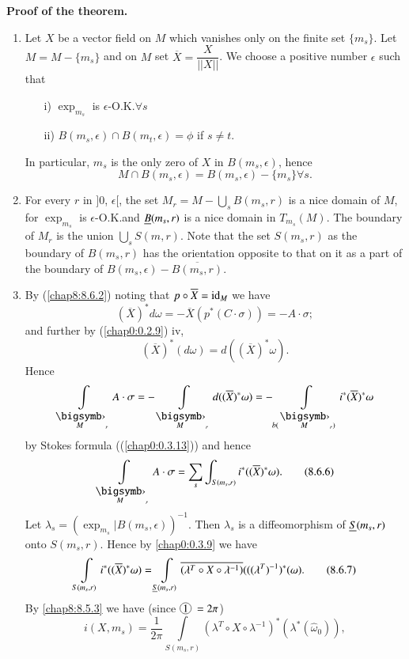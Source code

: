 \noindent
{\bf Proof of the theorem.}~\pageoriginale
\begin{enumerate}
\renewcommand{\theenumi}{\alph{enumi}}
\renewcommand{\labelenumi}{\theenumi)}
\item Let $X$ be a vector field
on $M$ which vanishes only on the finite set $\{m_{s}\}$. Let
$M=M-\{m_{s}\}$ and on $M$ set $\overline{X}=\dfrac{X}{||X||}$. We
choose a positive number $\epsilon$ such that
\begin{itemize}
\item[i)] $\exp_{m_{s}}$ is $\epsilon$-O.K.\@ $\forall s$

\item[ii)] $B(m_{s},\epsilon)\cap B(m_{t},\epsilon)=\phi$ if
  $s\neq t$.
\end{itemize}
In particular, $m_{s}$ is the only zero of $X$ in $B(m_{s},\epsilon)$,
hence
$$
M\cap B(m_{s},\epsilon)=B(m_{s},\epsilon)-\{m_{s}\}\forall s.
$$

\item For every $r$ in $]0$, $\epsilon[$, the set
    $M_{r}=M-\bigcup\limits_{s}B(m_{s},r)$ is a nice domain of $M$,
    for $\exp_{m_{s}}$ is $\epsilon$-O.K.\@ and $\underline{B}(m_{s},r)$ is a
    nice domain in $T_{m_{s}}(M)$. The boundary of $M_{r}$ is the
    union $\bigcup\limits_{s}S(m,r)$. Note that the set $S(m_{s},r)$
    as the boundary of $B(m_{s},r)$ has the orientation opposite to
    that on it as a part of the boundary of
    $B(m_{s},\epsilon)-\overline{B(m_{s},r)}$. 

\item By (\ref{chap8:8.6.2}) noting that $p\circ\overline{X}=\operatorname{id}_{M}$ we
  have
$$
(\overline{X})^{\ast}d\omega=-\overline{X}(p^{\ast}(C\cdot\sigma))=-A\cdot\sigma;
$$
and further by (\ref{chap0:0.2.9}) iv,
$$
(\overline{X})^{\ast}(d\omega)=d((\overline{X})^{\ast}\omega).
$$
Hence
$$
\int\limits_{\overdot{M}_{r}}A\cdot\sigma=-\int\limits_{\overdot{M}_{r}}d((\overline{X})^{\ast}\omega)=-\int\limits_{b(\overdot{M}_{r})}i^{\ast}(\overline{X})^{\ast}\omega
$$
by Stokes formula ((\ref{chap0:0.3.13})) and hence
\begin{equation*}
\int\limits_{\overdot{M}_{r}}A\cdot
\sigma=\sum_{s}\int_{S(m_{s},r)}i^{\ast}((\overline{X})^{\ast}\omega).\tag{8.6.6}\label{chap8:8.6.6} 
\end{equation*}
Let \pageoriginale
$\lambda_{s}=(\exp_{m_{s}}|B(m_{s},\epsilon))^{-1}$. Then
$\lambda_{s}$ is a diffeomorphism of $\underline{S}(m_{s},r)$ onto
$S(m_{s},r)$. Hence by \eqref{chap0:0.3.9} we have 
\begin{equation*}
\int\limits_{S(m_{s},r)}i^{\ast}((\overline{X})^{\ast}\omega)=\int\limits_{\underline{S}(m_{s},r)}\overline{(\lambda^{T}\circ
  X\circ
  \lambda^{-1})}(((\lambda^{T})^{-1})^{\ast}(\omega).\tag{8.6.7}\label{chap8:8.6.7}  
\end{equation*}
By \eqref{chap8:8.5.3} we have (since $\mycirc{1}=2\pi$)
\begin{equation*}
i(X,m_{s})=\frac{1}{2\pi}\int\limits_{S(m_{s},r)}\left(\lambda^{T}\circ X\circ \lambda^{-1}\right)^{\ast}\left(\lambda^{\ast}(\widehat{\omega}_{0})\right),\tag{8.6.8}\label{chap8:8.6.8}
\end{equation*}


\end{enumerate}
